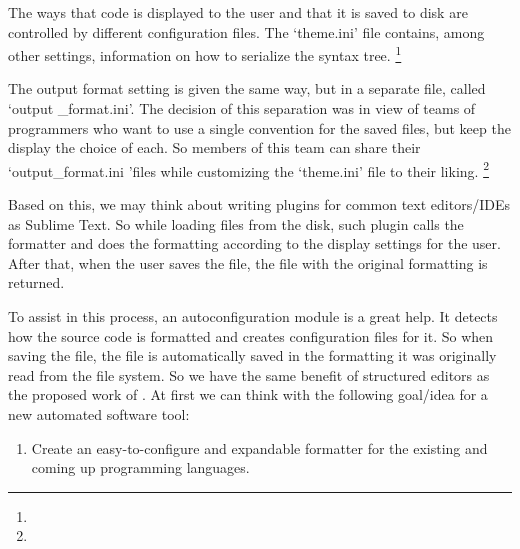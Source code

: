 \begin{citacao}
The ways that code is displayed to the user and that it is saved to disk are
controlled by different configuration files. The `theme.ini' file contains,
among other settings, information on how to serialize the syntax tree.
\cite[our translation]{structuredEditorStudy} \footnote{}
\end{citacao}
\begin{citacao}
The output format setting is given the same way, but in a separate file,
called `output \_format.ini'. The decision of this separation was in view of
teams of programmers who want to use a single convention for the saved
files, but keep the display the choice of each. So members of this team can
share their `output\_format.ini 'files while customizing the `theme.ini'
file to their liking. \cite[our translation]{structuredEditorStudy}
\footnote{}
\end{citacao}

Based on this, we may think about writing plugins for common text
editors/IDEs as Sublime Text. So while loading files from the disk, such
plugin calls the formatter and does the formatting according to the display
settings for the user. After that, when the user saves the file, the file
with the original formatting is returned.

To assist in this process, an autoconfiguration module is a great help. It
detects how the source code is formatted and creates configuration files for
it. So when saving the file, the file is automatically saved in the
formatting it was originally read from the file system. So we have the same
benefit of structured editors as the proposed work of
\textcite{structuredEditorStudy}. At first we can think with the following
goal/idea for a new automated software tool:

\medskip
\begin{bluebox}
\begin{enumerate}[nolistsep]
    \item Create an easy-to-configure and expandable formatter for the
    existing and coming up programming languages.
\end{enumerate}
\end{bluebox}



